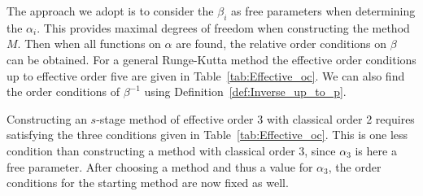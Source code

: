 The approach we adopt is to consider the $\beta_{i}$ as free parameters when determining the $\alpha_i$. This provides maximal degrees of freedom when constructing the method $M$. Then when all functions on $\alpha$ are found, the relative order conditions on $\beta$ can be obtained. For a general Runge-Kutta method the effective order conditions up to effective order five are given in Table~\ref{tab:Effective_oc}. We can also find the order conditions of $\beta^{-1}$ using
Definition~\ref{def:Inverse_up_to_p}.   


\begin{example}\label{ex:Effective_RK32}
	Constructing an $s$-stage method of effective order 3 with classical order 2 requires satisfying the three conditions given in Table~\ref{tab:Effective_oc}. This is one less condition than constructing a method with classical order 3, since $\alpha_3$ is here a free parameter. After choosing a method and thus a value for $\alpha_3$, the order conditions for the starting method are now fixed as well.
\end{example}


